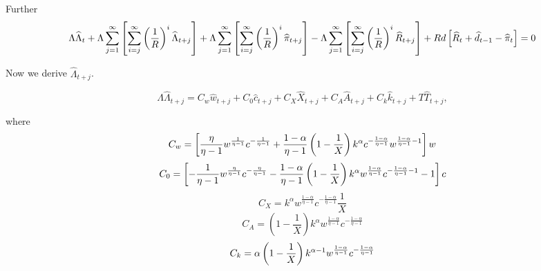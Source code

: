 \documentclass{article}
\begin{document}
Further%
\[
\Lambda \widehat{\Lambda }_{t}+\Lambda \sum_{j=1}^{\infty }\left[
\sum_{i=j}^{\infty }\left( \frac{1}{R}\right) ^{i}\widehat{\Lambda }_{t+j}%
\right] +\Lambda \sum_{j=1}^{\infty }\left[ \sum_{i=j}^{\infty }\left( \frac{%
1}{R}\right) ^{i}\widehat{\pi }_{t+j}\right] -\Lambda \sum_{j=1}^{\infty }%
\left[ \sum_{i=j}^{\infty }\left( \frac{1}{R}\right) ^{i}\widehat{R}_{t+j}%
\right] +Rd\left[ \widehat{R}_{t}+\widehat{d}_{t-1}-\widehat{\pi }_{t}\right]
=0 
\]

Now we derive $\widehat{\Lambda }_{t+j}$.

\[
\Lambda \widehat{\Lambda }_{t+j}=C_{w}\widehat{w}_{t+j}+C_{0}\widehat{c}%
_{t+j}+C_{X}\widehat{X}_{t+j}+C_{A}\widehat{A}_{t+j}+C_{k}\widehat{k}_{t+j}+T%
\widehat{T}_{t+j}, 
\]

where%
\[
C_{w}=\left[ \frac{\eta }{\eta -1}w^{\frac{1}{\eta -1}}c^{-\frac{1}{\eta -1}%
}+\frac{1-\alpha }{\eta -1}\left( 1-\frac{1}{X}\right) k^{\alpha }c^{-\frac{%
1-\alpha }{\eta -1}}w^{\frac{1-\alpha }{\eta -1}-1}\right] w 
\]%
\[
C_{0}=\left[ -\frac{1}{\eta -1}w^{\frac{\eta }{\eta -1}}c^{-\frac{\eta }{%
\eta -1}}-\frac{1-\alpha }{\eta -1}\left( 1-\frac{1}{X}\right) k^{\alpha }w^{%
\frac{1-\alpha }{\eta -1}}c^{-\frac{1-\alpha }{\eta -1}-1}-1\right] c 
\]%
\[
C_{X}=k^{\alpha }w^{\frac{1-\alpha }{\eta -1}}c^{-\frac{1-\alpha }{\eta -1}}%
\frac{1}{X} 
\]%
\[
C_{A}=\left( 1-\frac{1}{X}\right) k^{\alpha }w^{\frac{1-\alpha }{\eta -1}%
}c^{-\frac{1-\alpha }{\eta -1}} 
\]%
\[
C_{k}=\alpha \left( 1-\frac{1}{X}\right) k^{\alpha -1}w^{\frac{1-\alpha }{%
\eta -1}}c^{-\frac{1-\alpha }{\eta -1}} 
\]
\end{document}
